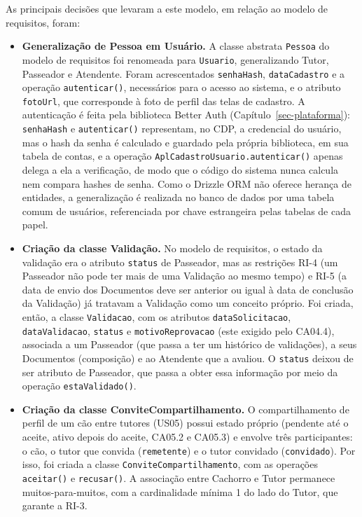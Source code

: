 As principais decisões que levaram a este modelo, em relação ao modelo de requisitos, foram:

\begin{itemize}
	\item \textbf{Generalização de Pessoa em Usuário.} A classe abstrata \texttt{Pessoa} do modelo de requisitos foi renomeada para \texttt{Usuario}, generalizando Tutor, Passeador e Atendente. Foram acrescentados \texttt{senhaHash}, \texttt{dataCadastro} e a operação \texttt{autenticar()}, necessários para o acesso ao sistema, e o atributo \texttt{fotoUrl}, que corresponde à foto de perfil das telas de cadastro. A autenticação é feita pela biblioteca Better Auth (Capítulo~\ref{sec-plataforma}): \texttt{senhaHash} e \texttt{autenticar()} representam, no CDP, a credencial do usuário, mas o hash da senha é calculado e guardado pela própria biblioteca, em sua tabela de contas, e a operação \texttt{AplCadastroUsuario.autenticar()} apenas delega a ela a verificação, de modo que o código do sistema nunca calcula nem compara hashes de senha. Como o Drizzle ORM não oferece herança de entidades, a generalização é realizada no banco de dados por uma tabela comum de usuários, referenciada por chave estrangeira pelas tabelas de cada papel.

	\item \textbf{Criação da classe Validação.} No modelo de requisitos, o estado da validação era o atributo \texttt{status} de Passeador, mas as restrições RI-4 (um Passeador não pode ter mais de uma Validação ao mesmo tempo) e RI-5 (a data de envio dos Documentos deve ser anterior ou igual à data de conclusão da Validação) já tratavam a Validação como um conceito próprio. Foi criada, então, a classe \texttt{Validacao}, com os atributos \texttt{dataSolicitacao}, \texttt{dataValidacao}, \texttt{status} e \texttt{motivoReprovacao} (este exigido pelo CA04.4), associada a um Passeador (que passa a ter um histórico de validações), a seus Documentos (composição) e ao Atendente que a avaliou. O \texttt{status} deixou de ser atributo de Passeador, que passa a obter essa informação por meio da operação \texttt{estaValidado()}.

	\item \textbf{Criação da classe ConviteCompartilhamento.} O compartilhamento de perfil de um cão entre tutores (US05) possui estado próprio (pendente até o aceite, ativo depois do aceite, CA05.2 e CA05.3) e envolve três participantes: o cão, o tutor que convida (\texttt{remetente}) e o tutor convidado (\texttt{convidado}). Por isso, foi criada a classe \texttt{ConviteCompartilhamento}, com as operações \texttt{aceitar()} e \texttt{recusar()}. A associação entre Cachorro e Tutor permanece muitos-para-muitos, com a cardinalidade mínima 1 do lado do Tutor, que garante a RI-3.


\end{itemize}
